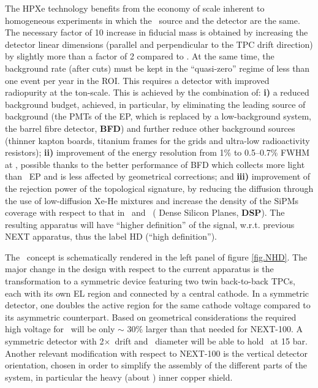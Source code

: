 
 The HPXe technology benefits from the economy of scale inherent to homogeneous experiments in which the \bbonu\ source and the detector are the same. The necessary factor of 10 increase in fiducial mass is obtained by increasing the detector linear dimensions (parallel and perpendicular to the TPC drift direction) by slightly more than a factor of 2 compared to \NEXT. At the same time, the background rate (after cuts) must be kept in the ``quasi-zero'' regime of less than one event per year in the ROI. This requires a detector with improved radiopurity at the ton-scale. This is achieved by the combination of: {\bf i)} a reduced background budget, achieved, in particular, by eliminating the leading source of background (the PMTs of the EP, which is replaced by a low-background system, the barrel fibre detector, {\bf BFD}) and further reduce other background sources (thinner kapton boards, titanium frames for the grids and ultra-low radioactivity resistors);  {\bf ii)} improvement of the energy resolution from 1\% to 0.5--0.7\% FWHM at \Qbb, possible thanks to the better  performance of BFD which collects more light than \Next\ EP and is less affected by geometrical corrections; and {\bf iii)} improvement of the rejection power of the topological signature, by reducing the diffusion through the use of low-diffusion Xe-He mixtures and increase the density of the SiPMs coverage with respect to that in \NEW\ and \Next\ ( Dense Silicon Planes, {\bf DSP}). The resulting apparatus will have ``higher definition'' of the signal, w.r.t. previous NEXT apparatus, thus the label HD (``high definition''). 
 
 
The \NHD\ concept is schematically rendered in the left panel of figure \ref{fig.NHD}. %
The major change in the design with respect to the current apparatus is the transformation to a symmetric device featuring two twin back-to-back TPCs, each  with its own EL region and connected by a central cathode. In a symmetric detector, one doubles the active region for the same cathode voltage compared to its asymmetric counterpart.  Based on geometrical considerations the required high voltage for \NHD\ will be only $\sim$ 30\% larger than that needed for NEXT-100. A symmetric detector with 2$\times$\XHDL\ drift and \XHDD\ diameter will be able to hold \XHDM\ at 15 bar. Another relevant modification with respect to NEXT-100 is the vertical detector orientation, chosen in order to simplify the assembly of the different parts of the system, in particular the heavy (about \XHDS) inner copper shield. 

